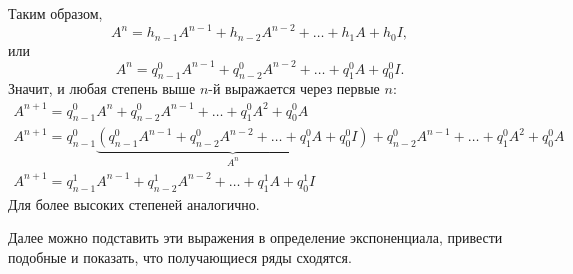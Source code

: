 Таким образом,
\begin{equation*}
    A^n = h_{n-1} A^{n-1} + h_{n-2}A^{n-2} + \ldots + h_1 A + h_0 I,
\end{equation*}
или
\begin{equation*}
    A^n = q^0_{n-1} A^{n-1} + q^0_{n-2}A^{n-2} + \ldots + q^0_1 A + q^0_0 I.
\end{equation*}
Значит, и любая степень выше $n$-й выражается через первые $n$:
\begin{gather*}
    A^{n+1} = q^0_{n-1} A^{n} + q^0_{n-2}A^{n-1} + \ldots + q^0_1 A^2 + q^0_0 A \\
    A^{n+1} = q^0_{n-1} \underbrace{\left( q^0_{n-1} A^{n-1} + q^0_{n-2}A^{n-2} + \ldots + q^0_1 A + q^0_0 I \right)}_{A^n}
    + q^0_{n-2}A^{n-1} + \ldots + q^0_1 A^2 + q^0_0 A \\
    A^{n+1} = q^1_{n-1} A^{n-1} + q^1_{n-2}A^{n-2} + \ldots + q^1_1 A + q^1_0 I
\end{gather*}
Для более высоких степеней аналогично.

Далее можно подставить эти выражения в определение экспоненциала, привести подобные и показать, что получающиеся ряды сходятся.

